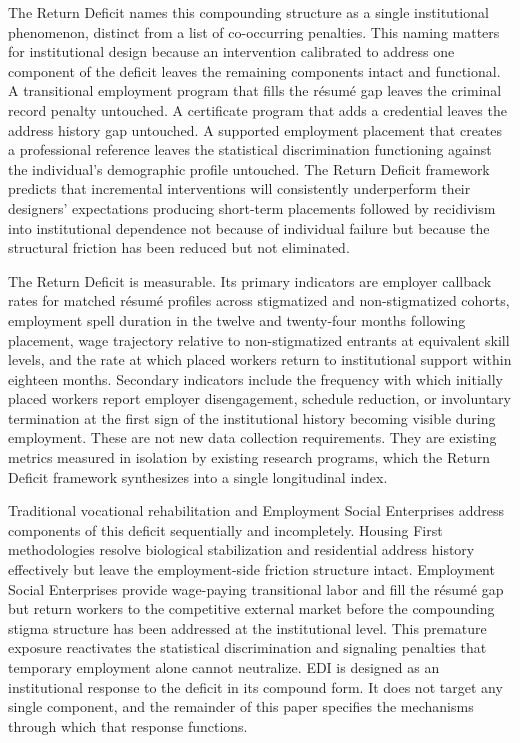 \documentclass[12pt, letterpaper]{article}
\begin{document}
The Return Deficit names this compounding structure as a single institutional phenomenon, distinct from a list of co-occurring penalties. This naming matters for institutional design because an intervention calibrated to address one component of the deficit leaves the remaining components intact and functional. A transitional employment program that fills the r\'{e}sum\'{e} gap leaves the criminal record penalty untouched. A certificate program that adds a credential leaves the address history gap untouched. A supported employment placement that creates a professional reference leaves the statistical discrimination functioning against the individual's demographic profile untouched. The Return Deficit framework predicts that incremental interventions will consistently underperform their designers' expectations producing short-term placements followed by recidivism into institutional dependence not because of individual failure but because the structural friction has been reduced but not eliminated.

The Return Deficit is measurable. Its primary indicators are employer callback rates for matched r\'{e}sum\'{e} profiles across stigmatized and non-stigmatized cohorts, employment spell duration in the twelve and twenty-four months following placement, wage trajectory relative to non-stigmatized entrants at equivalent skill levels, and the rate at which placed workers return to institutional support within eighteen months. Secondary indicators include the frequency with which initially placed workers report employer disengagement, schedule reduction, or involuntary termination at the first sign of the institutional history becoming visible during employment. These are not new data collection requirements. They are existing metrics measured in isolation by existing research programs, which the Return Deficit framework synthesizes into a single longitudinal index.

Traditional vocational rehabilitation and Employment Social Enterprises address components of this deficit sequentially and incompletely. Housing First methodologies \citep{tsemberis2004housing} resolve biological stabilization and residential address history effectively but leave the employment-side friction structure intact. Employment Social Enterprises provide wage-paying transitional labor and fill the r\'{e}sum\'{e} gap but return workers to the competitive external market before the compounding stigma structure has been addressed at the institutional level. This premature exposure reactivates the statistical discrimination and signaling penalties that temporary employment alone cannot neutralize. EDI is designed as an institutional response to the deficit in its compound form. It does not target any single component, and the remainder of this paper specifies the mechanisms through which that response functions.
\end{document}

